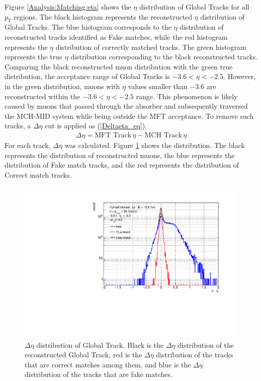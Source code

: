             Figure \ref{Analysis:Matching:eta} shows the \(\eta\) distribution of Global Tracks for all \(p_T\) regions. The black histogram represents the reconstructed \(\eta\) distribution of Global Tracks. The blue histogram corresponds to the \(\eta\) distribution of reconstructed tracks identified as Fake matches, while the red histogram represents the \(\eta\) distribution of correctly matched tracks. The green histogram represents the true \(\eta\) distribution corresponding to the black reconstructed tracks.  
            Comparing the black reconstructed muon distribution with the green true distribution, the acceptance range of Global Tracks is \(-3.6 < \eta < -2.5\). However, in the green distribution, muons with \(\eta\) values smaller than \(-3.6\) are reconstructed within the \(-3.6 < \eta < -2.5\) range. This phenomenon is likely caused by muons that passed through the absorber and subsequently traversed the MCH-MID system while being outside the MFT acceptance. 
            To remove such tracks, a \(\Delta \eta\) cut is applied as (\ref{Deltaeta_eq}).
            \begin{eqnarray}
                \label{Deltaeta_eq}
                \Delta \eta = \text{MFT Track} \, \eta - \text{MCH Track} \, \eta  
            \end{eqnarray}
            For each track, \(\Delta \eta\) was calculated. Figure \ref{Analysis:Matching:DeltaEta} shows the distribution. The black represents the distribution of reconstructed muons, the blue represents the distribution of Fake match tracks, and the red represents the distribution of Correct match tracks.
            \begin{figure}[H]
                \centering
                \includegraphics[keepaspectratio, scale=0.5]{fig/3_5_6_etacutno_deltaeta.pdf} %
                \caption{$\Delta \eta$ distribution of Global Track. Black is the $\Delta \eta$ distribution of the reconstructed Global Track, red is the $\Delta \eta$ distribution of the tracks that are correct matches among them, and blue is the $\Delta \eta$ distribution of the tracks that are fake matches.}
                \label{Analysis:Matching:DeltaEta}
            \end{figure}
